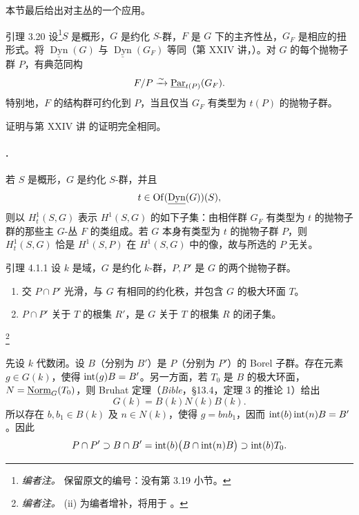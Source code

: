 本节最后给出对主丛的一个应用。
\begin{sgastatement}{引理 3.20}
设\footnote{\emph{编者注。} 保留原文的编号：没有第 3.19 小节。}\(S\) 是概形，\(G\) 是约化 \(S\)-群，\(F\) 是 \(G\) 下的主齐性丛，\(G_F\) 是相应的扭形式。将 \(\underline{\operatorname{Dyn}}(G)\) 与 \(\underline{\operatorname{Dyn}}(G_F)\) 等同（第 XXIV 讲，）。对 \(G\) 的每个抛物子群 \(P\)，有典范同构
\[
 F/P\xrightarrow{\sim}\underline{\operatorname{Par}}_{t(P)}(G_F).
\]
特别地，\(F\) 的结构群可约化到 \(P\)，当且仅当 \(G_F\) 有类型为 \(t(P)\) 的抛物子群。
\end{sgastatement}

证明与第 XXIV 讲  的证明完全相同。

\paragraph{.}
若 \(S\) 是概形，\(G\) 是约化 \(S\)-群，并且
\[
 t\in\operatorname{Of}(\underline{\operatorname{Dyn}}(G))(S),
\]
则以 \(H^1_t(S,G)\) 表示 \(H^1(S,G)\) 的如下子集：由相伴群 \(G_F\) 有类型为 \(t\) 的抛物子群的那些主 \(G\)-丛 \(F\) 的类组成。若 \(G\) 本身有类型为 \(t\) 的抛物子群 \(P\)，则 \(H^1_t(S,G)\) 恰是 \(H^1(S,P)\) 在 \(H^1(S,G)\) 中的像，故与所选的 \(P\) 无关。


\begin{sgastatement}{引理 4.1.1}
设 \(k\) 是域，\(G\) 是约化 \(k\)-群，\(P,P'\) 是 \(G\) 的两个抛物子群。
\begin{enumerate}[label=\textup{(\roman*)}]
\item 交 \(P\cap P'\) 光滑，与 \(G\) 有相同的约化秩，并包含 \(G\) 的极大环面 \(T\)。
\item \(P\cap P'\) 关于 \(T\) 的根集 \(R'\)，是 \(G\) 关于 \(T\) 的根集 \(R\) 的闭子集。
\end{enumerate}
\end{sgastatement}
\footnote{\emph{编者注。} (ii) 为编者增补，将用于 。}

\SGAProof
先设 \(k\) 代数闭。设 \(B\)（分别为 \(B'\)）是 \(P\)（分别为 \(P'\)）的 Borel 子群。存在元素 \(g\in G(k)\)，使得 \(\operatorname{int}(g)B=B'\)。另一方面，若 \(T_0\) 是 \(B\) 的极大环面，\(N=\underline{\operatorname{Norm}}_G(T_0)\)，则 Bruhat 定理（\emph{Bible}，\S13.4，定理 3 的推论 1）给出
\[
 G(k)=B(k)N(k)B(k).
\]
所以存在 \(b,b_1\in B(k)\) 及 \(n\in N(k)\)，使得 \(g=bnb_1\)，因而 \(\operatorname{int}(b)\operatorname{int}(n)B=B'\)。因此
\[
 P\cap P'\supset B\cap B'
  =\operatorname{int}(b)\bigl(B\cap\operatorname{int}(n)B\bigr)
  \supset\operatorname{int}(b)T_0.
\]

